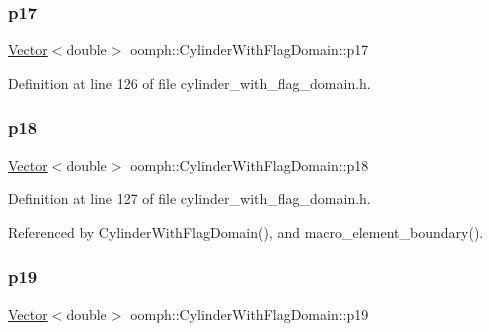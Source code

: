 \subsubsection{\texorpdfstring{p17}{p17}}
{\footnotesize\ttfamily \hyperlink{classoomph_1_1Vector}{Vector}$<$double$>$ oomph\+::\+Cylinder\+With\+Flag\+Domain\+::p17\hspace{0.3cm}{\ttfamily [private]}}



Definition at line 126 of file cylinder\+\_\+with\+\_\+flag\+\_\+domain.\+h.

\mbox{\label{classoomph_1_1CylinderWithFlagDomain_a0076ec3ac4fbd0213719a2d2679ab1db}} 
\subsubsection{\texorpdfstring{p18}{p18}}
{\footnotesize\ttfamily \hyperlink{classoomph_1_1Vector}{Vector}$<$double$>$ oomph\+::\+Cylinder\+With\+Flag\+Domain\+::p18\hspace{0.3cm}{\ttfamily [private]}}



Definition at line 127 of file cylinder\+\_\+with\+\_\+flag\+\_\+domain.\+h.



Referenced by Cylinder\+With\+Flag\+Domain(), and macro\+\_\+element\+\_\+boundary().

\mbox{\label{classoomph_1_1CylinderWithFlagDomain_a0a3ba355180e34fc7372fef35a6accb7}} 
\subsubsection{\texorpdfstring{p19}{p19}}
{\footnotesize\ttfamily \hyperlink{classoomph_1_1Vector}{Vector}$<$double$>$ oomph\+::\+Cylinder\+With\+Flag\+Domain\+::p19\hspace{0.3cm}{\ttfamily [private]}}



